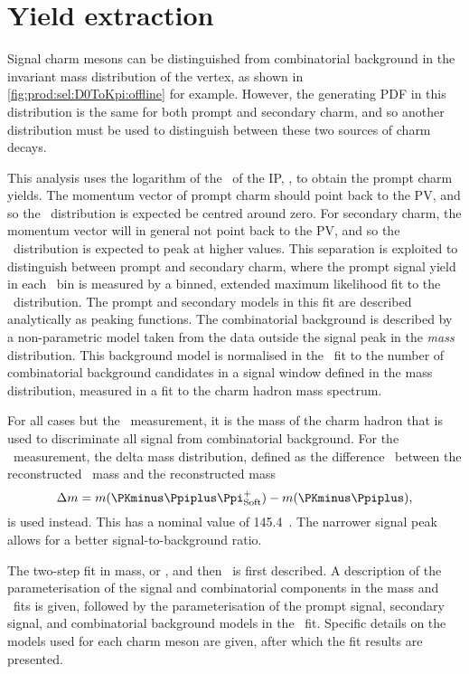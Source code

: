 \chapter{Yield extraction}
\label{chap:prod:fitting}

Signal charm mesons can be distinguished from combinatorial background in the 
invariant mass distribution of the vertex, as shown in 
\cref{fig:prod:sel:D0ToKpi:offline} for example.
However, the generating \acf{PDF} in this distribution is the same for both 
prompt and secondary charm, and so another distribution must be used to 
distinguish between these two sources of charm decays.

This analysis uses the logarithm of the \chisq\ of the \acl{IP}, \lnipchisq, to 
obtain the prompt charm yields.
The momentum vector of prompt charm should point back to the \ac{PV}, and so 
the \lnipchisq\ distribution is expected be centred around zero.
For secondary charm, the momentum vector will in general not point back to the 
\ac{PV}, and so the \lnipchisq\ distribution is expected to peak at higher 
values.
This separation is exploited to distinguish between prompt and secondary charm, 
where the prompt signal yield in each \pTy\ bin is measured by a binned, 
extended maximum likelihood fit to the \lnipchisq\ distribution.
The prompt and secondary models in this fit are described analytically as 
peaking functions.
The combinatorial background is described by a non-parametric model taken from 
the data outside the signal peak in the \emph{mass} distribution.
This background model is normalised in the \lnipchisq\ fit to the number of 
combinatorial background candidates in a signal window defined in the mass 
distribution, measured in a fit to the charm hadron mass spectrum.

For all cases but the \PDstarp\ measurement, it is the mass of the charm hadron 
that is used to discriminate all signal from combinatorial background.
For the \PDstarp\ measurement, the delta mass distribution, defined as the 
difference \deltam\ between the reconstructed \PDstarp\ mass and the 
reconstructed \PDzero mass
\begin{equation}
  \deltam = m(\PKminus\Ppiplus\Ppiplussoft) - m(\PKminus\Ppiplus),
  \label{eqn:prod:fitting:delta_mass}
\end{equation}
is used instead.
This has a nominal value of \SI{145.4}{\MeVcc}~\cite{PDG2014}.
The narrower signal peak allows for a better signal-to-background ratio.

The two-step fit in mass, or \deltam, and then \lnipchisq\ is first described.
A description of the parameterisation of the signal and combinatorial 
components in the mass and \deltam\ fits is given, followed by the 
parameterisation of the prompt signal, secondary signal, and combinatorial 
background models in the \lnipchisq\ fit.
Specific details on the models used for each charm meson are given, after which 
the fit results are presented.

